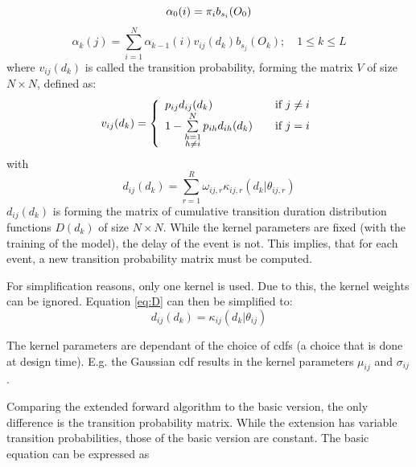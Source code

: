 \documentclass[mscthesis]{usiinfthesis}
\begin{document}
\begin{equation}
    \label{eq:forward_init}
    \alpha_0(i) = \pi_{i}b_{s_i}(O_0) \\
\end{equation}
\begin{equation}
    \label{eq:forward}
    \alpha_k(j) = \sum_{i=1}^{N} \alpha_{k-1}(i) v_{ij}(d_k) b_{s_j}(O_k);
    \quad 1 \leq k \leq L
\end{equation}
where $v_{ij}(d_k)$ is called the transition probability, forming the matrix
$V$ of size $N \times N$, defined as:
\begin{equation}
    \label{eq:V}
    v_{ij}(d_k) = \left\{
        \begin{array}{l l}
            p_{ij} d_{ij}(d_k)
                & \quad \text{if $j \neq i$}\\
            1 - \sum\limits_{\substack{h=1 \\ h \neq i}}^{N} p_{ih} d_{ih}(d_k)
                & \quad \text{if $j = i$}
        \end{array} \right.
\end{equation}
with
\begin{equation}
    \label{eq:D}
    d_{ij}(d_k) = \sum_{r=1}^{R} \omega_{ij,r}\kappa_{ij,r}(d_k|\theta_{ij, r})
\end{equation}
$d_{ij}(d_k)$ is forming the matrix of cumulative transition duration
distribution functions $D(d_k)$ of size $ N\times N$. While the kernel
parameters are fixed (with the training of the model), the delay of the event
is not. This implies, that for each event, a new transition probability matrix
must be computed.

For simplification reasons, only one kernel is used. Due to this, the kernel
weights can be ignored. Equation \ref{eq:D} can then be simplified to:
\begin{equation}
    \label{eq:D_fact}
    d_{ij}(d_k) = \kappa_{ij}(d_k | \theta_{ij})
\end{equation}

The kernel parameters are dependant of the choice of \glspl{cdf} (a choice that
is done at design time). E.g. the Gaussian \gls{cdf} results in the kernel
parameters $\mu_{ij}$ and $\sigma_{ij}$.

Comparing the extended forward algorithm to the basic version, the only
difference is the transition probability matrix. While the extension has
variable transition probabilities, those of the basic version are constant. The
basic equation can be expressed as
\end{document}
